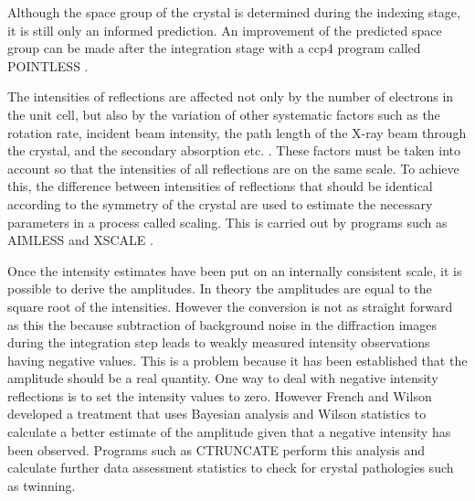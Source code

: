         Although the space group of the crystal is determined during the indexing stage, it is still only an informed prediction.
        An improvement of the predicted space group can be made after the integration stage with a ccp4 program called POINTLESS \cite{evans2011introduction}.

        The intensities of reflections are affected not only by the number of electrons in the unit cell, but also by the variation of other systematic factors such as the rotation rate, incident beam intensity, the path length of the X-ray beam through the crystal, and the secondary absorption etc. \cite{evans2005}.
        These factors must be taken into account so that the intensities of all reflections are on the same scale.
        To achieve this, the difference between intensities of reflections that should be identical according to the symmetry of the crystal are used to estimate the necessary parameters in a process called scaling.
        This is carried out by programs such as AIMLESS \cite{evans2013} and XSCALE \cite{kabsch2010}.

        Once the intensity estimates have been put on an internally consistent scale, it is possible to derive the amplitudes.
        In theory the amplitudes are equal to the square root of the intensities.
        However the conversion is not as straight forward as this the because subtraction of background noise in the diffraction images during the integration step leads to weakly measured intensity observations having negative values.
        This is a problem because it has been established that the amplitude should be a real quantity.
        One way to deal with negative intensity reflections is to set the intensity values to zero.
        However French and Wilson developed a treatment that uses Bayesian analysis \cite{french1978treatment} and Wilson statistics \cite{wilson1949probability} to calculate a better estimate of the amplitude given that a negative intensity has been observed.
        Programs such as CTRUNCATE \cite{evans2011introduction} perform this analysis and calculate further data assessment statistics to check for crystal pathologies such as twinning.

